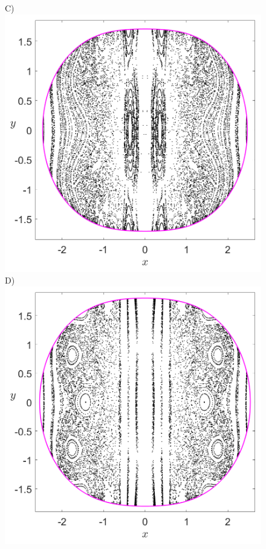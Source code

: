 \documentclass[10pt,aps,onecolumn,superscriptaddress]{revtex4-2}
\begin{document}
\begin{figure}[htbp]
	C)\includegraphics[scale=0.3]{PS_px_0_H_-0_2_w0_1div2_k_sqrt7_min_3delta_d_1.png}
	D)\includegraphics[scale=0.3]{PS_px_0_H_-0_2_w0_1div2_k_sqrt7_min_2delta_d_1.png}

\end{figure}
\end{document}
